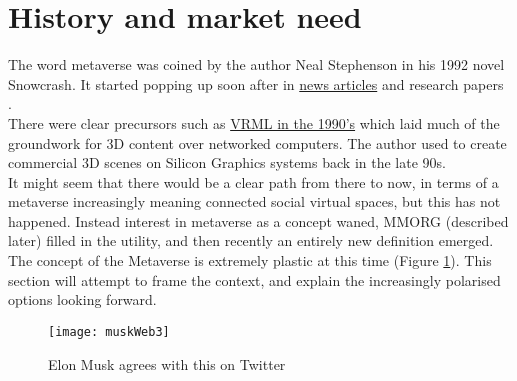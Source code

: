 
\section{History and market need}

The word metaverse was coined by the author Neal Stephenson in his 1992 novel Snowcrash. It started popping up soon after in \href{https://www.newscientist.com/article/mg14819994-000-how-to-build-a-metaverse/}{news articles} and research papers \cite{mclellan1993avatars}.\\
There were clear precursors such as \href{https://www.howtogeek.com/778554/remembering-vrml-the-metaverse-of-1995/}{VRML in the 1990's} which laid much of the groundwork for 3D content over networked computers. The author used to create commercial 3D scenes on Silicon Graphics systems back in the late 90s.\\
It might seem that there would be a clear path from there to now, in terms of a metaverse increasingly meaning connected social virtual spaces, but this has not happened. Instead interest in metaverse as a concept waned, MMORG (described later) filled in the utility, and then recently an entirely new definition emerged. The concept of the Metaverse is extremely plastic at this time (Figure \ref{fig:muskWeb3}). This section will attempt to frame the context, and explain the increasingly polarised options looking forward.\\

\begin{figure}
  \centering
    \texttt{[image: muskWeb3]}
  \caption{Elon Musk agrees with this on Twitter}
  \label{fig:muskWeb3}
\end{figure}

